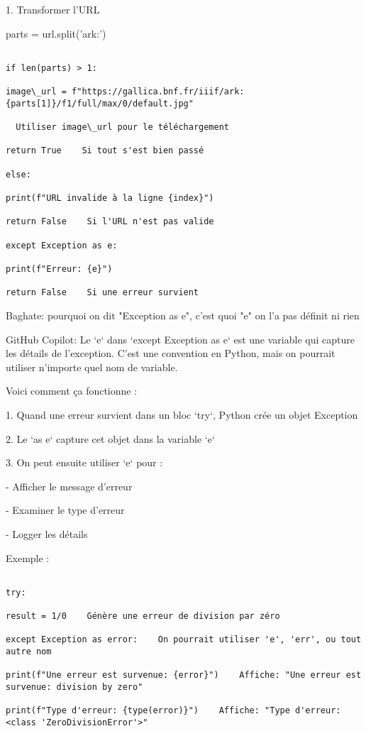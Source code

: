   1. Transformer l'URL

parts = url.split('ark:')

\begin{verbatim}

if len(parts) > 1:

image\_url = f"https://gallica.bnf.fr/iiif/ark:{parts[1]}/f1/full/max/0/default.jpg"

  Utiliser image\_url pour le téléchargement

return True    Si tout s'est bien passé

else:

print(f"URL invalide à la ligne {index}")

return False    Si l'URL n'est pas valide

except Exception as e:

print(f"Erreur: {e}")

return False    Si une erreur survient

\end{verbatim}

Baghate: pourquoi on dit "Exception as e", c'est quoi "e" on l'a pas définit ni rien

GitHub Copilot: Le `e` dans `except Exception as e` est une variable qui capture les détails de l'exception. C'est une convention en Python, mais on pourrait utiliser n'importe quel nom de variable.

Voici comment ça fonctionne :

1. Quand une erreur survient dans un bloc `try`, Python crée un objet Exception

2. Le `as e` capture cet objet dans la variable `e`

3. On peut ensuite utiliser `e` pour :

- Afficher le message d'erreur

- Examiner le type d'erreur

- Logger les détails

Exemple :

\begin{verbatim}

try:

result = 1/0    Génère une erreur de division par zéro

except Exception as error:    On pourrait utiliser 'e', 'err', ou tout autre nom

print(f"Une erreur est survenue: {error}")    Affiche: "Une erreur est survenue: division by zero"

print(f"Type d'erreur: {type(error)}")    Affiche: "Type d'erreur: <class 'ZeroDivisionError'>"

\end{verbatim}

